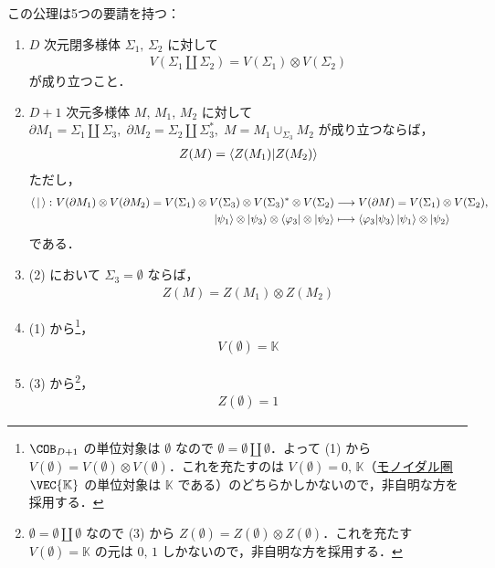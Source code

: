 \documentclass[TQFT_main]{subfiles}
\begin{document}
\begin{description}
    この公理は5つの要請を持つ：
    \begin{enumerate}
        \item $D$ 次元閉多様体 $\Sigma_1,\, \Sigma_2$ に対して
        \begin{align}
            V(\Sigma_1 \amalg \Sigma_2) = V(\Sigma_1) \otimes V(\Sigma_2)
        \end{align}
        が成り立つこと．
        \item $D+1$ 次元多様体 $M,\, M_1,\, M_2$ に対して $\partial M_1 = \Sigma_1 \amalg \Sigma_3,\; \partial M_2 = \Sigma_2 \amalg \Sigma_3^*,\; M = M_1 \cup_{\Sigma_3} M_2$ が成り立つならば，
        \begin{align}
            Z(M) = \braket{Z(M_1)}{Z(M_2)}
        \end{align}
        ただし，
        \begin{align}
            \braket{\,}{\,} \colon V(\partial M_1) \otimes V(\partial M_2) = V(\Sigma_1) \otimes V(\Sigma_3) \otimes V(\Sigma_3)^* \otimes V(\Sigma_2) &\longrightarrow V(\partial M) = V(\Sigma_1) \otimes V(\Sigma_2), \\
            \ket{\psi_1} \otimes \ket{\psi_3} \otimes \bra{\varphi_3} \otimes \ket{\psi_2} &\longmapsto \braket{\varphi_3}{\psi_3} \ket{\psi_1} \otimes \ket{\psi_2}
        \end{align}
        である．
        \item (2) において $\Sigma_3 = \emptyset$ ならば，
        \begin{align}
            Z(M) = Z(M_1) \otimes Z(M_2)
        \end{align}
        \item (1) から\footnote{$\COB_{D+1}$ の単位対象は $\emptyset$ なので $\emptyset = \emptyset \amalg \emptyset$．よって (1) から $V(\emptyset) = V(\emptyset) \otimes V(\emptyset)$．これを充たすのは $V(\emptyset) = 0,\, \mathbb{K}$（\hyperref[def:monoidal-category]{モノイダル圏} $\VEC{\mathbb{K}}$ の単位対象は $\mathbb{K}$ である）のどちらかしかないので，非自明な方を採用する．}，
        \begin{align}
            V(\emptyset) = \mathbb{K}
        \end{align}
        \item (3) から\footnote{$\emptyset = \emptyset \amalg \emptyset$ なので (3) から $Z(\emptyset) = Z(\emptyset) \otimes Z(\emptyset)$．これを充たす $V(\emptyset) = \mathbb{K}$ の元は $0,\, 1$ しかないので，非自明な方を採用する．}，
        \begin{align}
            Z(\emptyset) = 1
        \end{align}
    \end{enumerate}
\end{description}
\end{document}
